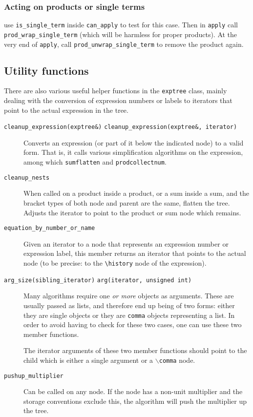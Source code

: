 \documentclass[11pt]{article}
\newcommand{\member}[1]{{\tt #1}}
\newcommand{\texcommand}[1]{{\tt $\backslash$#1}}
\numberwithin{equation}{section}
\begin{document}
\subsubsection{Acting on products or single terms}

use \member{is\_single\_term} inside \member{can\_apply} to test for
this case. Then in \member{apply} call
\member{prod\_wrap\_single\_term} (which will be harmless for proper
products). At the very end of \member{apply}, call
\member{prod\_unwrap\_single\_term} to remove the product again.


\subsection{Utility functions}

\label{s:utility}
There are also various useful helper functions in the {\tt exptree} 
class, mainly dealing with the conversion of expression numbers or
labels to iterators that point to the actual expression in the tree.
\begin{description}
\item[\vbox{\hbox{\member{cleanup\_expression(exptree\&)}}
            \hbox{\member{cleanup\_expression(exptree\&, iterator)}}}]
Converts an expression (or part of it below the indicated node) to
a valid form. That is, it calls various simplification algorithms
on the expression, among which {\tt sumflatten} and {\tt prodcollectnum}. 

\item[\member{cleanup\_nests}] When called on a product inside a
  product, or a sum inside a sum, and the bracket types of both node
  and parent are the same, flatten the tree. Adjusts the iterator to
  point to the product or sum node which remains.

\item[\member{equation\_by\_number\_or\_name}] Given an iterator
to a node that represents an expression number or expression label,
this member returns an iterator that points to the actual node
(to be precise: to the \verb|\history| node of the expression).

\item[\vbox{\hbox{\member{arg\_size(sibling\_iterator)}}
      \hbox{\member{arg(iterator, unsigned int)}}}]
Many algorithms require one \emph{or more} objects as arguments. These
are usually passed as lists, and therefore end up being of two forms:
either they are single objects or they are {\tt comma} objects
representing a list. In order to avoid having to check for these two
cases, one can use these two member functions.

The iterator arguments of these two member functions should point to
the child which is either a single argument or a \texcommand{comma}
node.

\item[\member{pushup\_multiplier}] Can be called on any node. If the
  node has a non-unit multiplier and the storage conventions exclude
  this, the algorithm will push the multiplier up the tree.
\end{description}
\end{document}
